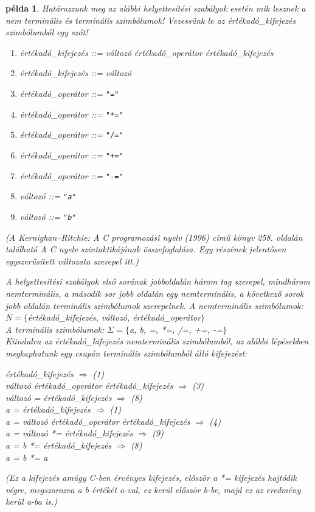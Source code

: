 \documentclass[a4paper]{article}
\newtheorem{pelda}{példa}[section]
\begin{document}
\begin{pelda}
\label{pl:c}
Határozzunk meg az alábbi helyettesítési szabályok esetén mik lesznek a
nem terminális és terminális szimbólumok!  Vezessünk le az
értékadó\_kifejezés szimbólumból egy szót!

{\it
\begin{enumerate}
\item értékadó\_kifejezés ::= változó értékadó\_operátor értékadó\_kifejezés
\item értékadó\_kifejezés ::= változó
\item értékadó\_operátor ::=  \verb|"="|
\item értékadó\_operátor ::=  \verb|"*="|
\item értékadó\_operátor ::=  \verb|"/="|
\item értékadó\_operátor ::=  \verb|"+="|
\item értékadó\_operátor ::=  \verb|"-="|
\item változó ::= \verb|"a"|
\item változó ::= \verb|"b"|
\end{enumerate}
}

(A Kernighan--Ritchie: \emph{A C programozási nyelv} (1996) című könyv
258. oldalán található \emph{A C nyelv szintaktikájának összefoglalása}.
Egy részének jelentősen egyszerűsített változata szerepel itt.)

A helyettesítési szabályok első sorának jobboldalán három tag szerepel,
mindhárom nemterminális, a második sor jobb oldalán egy nemterminális, a
következő sorok jobb oldalán terminális szimbólumok szerepelnek. A
nemterminális szimbólumok:\\
$N=\{$értékadó\_kifejezés, változó, értékadó\_operátor$\}$\\
A terminális szimbólumok: $\Sigma=\{$a, b, =, *=, /=, +=, -=$\}$\\

Kiindulva az {\it értékadó\_kifejezés} nemterminális szimbólumból, az
alábbi lépésekben megkaphatunk egy csupán terminális szimbólumból álló
kifejezést:

{\it
\noindent
értékadó\_kifejezés   \quad$\Rightarrow$ (1)\\
változó értékadó\_operátor értékadó\_kifejezés   \quad$\Rightarrow$ (3)\\
változó = értékadó\_kifejezés   \quad$\Rightarrow$ (8)\\
a = értékadó\_kifejezés   \quad$\Rightarrow$ (1)\\
a = változó értékadó\_operátor értékadó\_kifejezés   \quad$\Rightarrow$
(4)\\
a = változó *= értékadó\_kifejezés   \quad$\Rightarrow$ (9)\\
a = b *= értékadó\_kifejezés   \quad$\Rightarrow$ (8)\\
a = b *= a\\
}

{\small
(Ez a kifejezés amúgy C-ben érvényes kifejezés, először a *= kifejezés
hajtódik végre, megszorozva a b értékét a-val, ez kerül először b-be,
majd ez az eredmény kerül a-ba is.)
}
\end{pelda}
\end{document}

